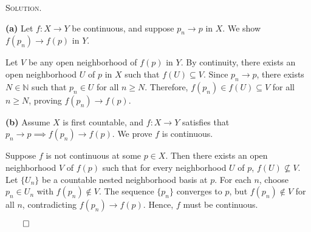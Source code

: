 \documentclass[12pt, a4paper, oneside]{ctexart}
\newenvironment{solution}{%
	\par\noindent\textsc{Solution. }\ignorespaces
}{%
	\hfill$\qed$\par
}
\begin{document}
	\begin{solution}
		
		
		\textbf{(a)}
		Let \( f: X \to Y \) be continuous, and suppose \( p_n \to p \) in \( X \). We show \( f(p_n) \to f(p) \) in \( Y \).
		
		
		Let \( V \) be any open neighborhood of \( f(p) \) in \( Y \). By continuity, there exists an open neighborhood \( U \) of \( p \) in \( X \) such that \( f(U) \subseteq V \).
		 Since \( p_n \to p \), there exists \( N \in \mathbb{N} \) such that \( p_n \in U \) for all \( n \geq N \).
		Therefore, \( f(p_n) \in f(U) \subseteq V \) for all \( n \geq N \), proving \( f(p_n) \to f(p) \).

		
		\textbf{(b)}
		Assume \( X \) is first countable, and \( f: X \to Y \) satisfies that \( p_n \to p \implies f(p_n) \to f(p) \). We prove \( f \) is continuous.
		
		Suppose \( f \) is not continuous at some \( p \in X \). Then there exists an open neighborhood \( V \) of \( f(p) \) such that for every neighborhood \( U \) of \( p \), \( f(U) \nsubseteq V \).
		 Let \( \{U_n\} \) be a countable nested neighborhood basis at \( p \). For each \( n \), choose \( p_n \in U_n \) with \( f(p_n) \notin V \).
		The sequence \( \{p_n\} \) converges to \( p \), but \( f(p_n) \notin V \) for all \( n \), contradicting \( f(p_n) \to f(p) \).
		 Hence, \( f \) must be continuous. 

	\end{solution}
\end{document}
